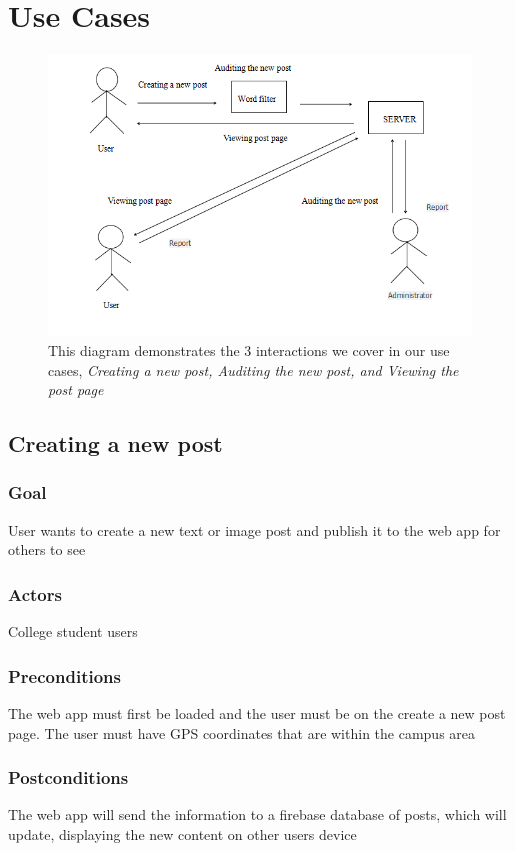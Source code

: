 \documentclass[12pt]{article}
\begin{document}
\section{Use Cases}

\begin{figure}
  \includegraphics[scale=0.75]{use_case_diagram}
  \caption{This diagram demonstrates the 3 interactions we cover in our use cases, \textit{Creating a new post, Auditing the new post, and Viewing the post page}}
\end{figure}

\subsection{Creating a new post}

\subsubsection{Goal}
User wants to create a new text or image post and publish it to the web app for others to see

\subsubsection{Actors}
College student users

\subsubsection{Preconditions}
The web app must first be loaded and the user must be on the create a new post page. The user must have GPS coordinates that are within the campus area

\subsubsection{Postconditions}
The web app will send the information to a firebase database of posts, which will update, displaying the new content on other users device
\end{document}
